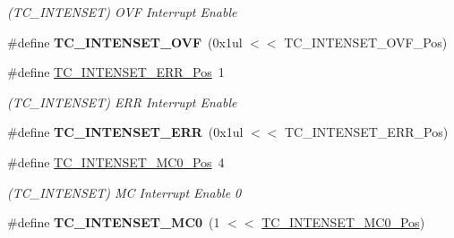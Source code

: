 \begin{DoxyCompactItemize}
\begin{DoxyCompactList}\small\item\em (T\+C\+\_\+\+I\+N\+T\+E\+N\+S\+E\+T) O\+V\+F Interrupt Enable \end{DoxyCompactList}\item 
\hypertarget{group___s_a_m_l21___t_c_ga48976807e0a0c60c70bce24f1c0f7e1d}{}\#define {\bfseries T\+C\+\_\+\+I\+N\+T\+E\+N\+S\+E\+T\+\_\+\+O\+V\+F}~(0x1ul $<$$<$ T\+C\+\_\+\+I\+N\+T\+E\+N\+S\+E\+T\+\_\+\+O\+V\+F\+\_\+\+Pos)\label{group___s_a_m_l21___t_c_ga48976807e0a0c60c70bce24f1c0f7e1d}

\item 
\hypertarget{group___s_a_m_l21___t_c_ga96296c6832f62b741447c9226dee8327}{}\#define \hyperlink{group___s_a_m_l21___t_c_ga96296c6832f62b741447c9226dee8327}{T\+C\+\_\+\+I\+N\+T\+E\+N\+S\+E\+T\+\_\+\+E\+R\+R\+\_\+\+Pos}~1\label{group___s_a_m_l21___t_c_ga96296c6832f62b741447c9226dee8327}

\begin{DoxyCompactList}\small\item\em (T\+C\+\_\+\+I\+N\+T\+E\+N\+S\+E\+T) E\+R\+R Interrupt Enable \end{DoxyCompactList}\item 
\hypertarget{group___s_a_m_l21___t_c_gaa51b27ce018d95a3a16f79acb17a0cb6}{}\#define {\bfseries T\+C\+\_\+\+I\+N\+T\+E\+N\+S\+E\+T\+\_\+\+E\+R\+R}~(0x1ul $<$$<$ T\+C\+\_\+\+I\+N\+T\+E\+N\+S\+E\+T\+\_\+\+E\+R\+R\+\_\+\+Pos)\label{group___s_a_m_l21___t_c_gaa51b27ce018d95a3a16f79acb17a0cb6}

\item 
\hypertarget{group___s_a_m_l21___t_c_gaeb76aeead8335324a610dabc36f7edea}{}\#define \hyperlink{group___s_a_m_l21___t_c_gaeb76aeead8335324a610dabc36f7edea}{T\+C\+\_\+\+I\+N\+T\+E\+N\+S\+E\+T\+\_\+\+M\+C0\+\_\+\+Pos}~4\label{group___s_a_m_l21___t_c_gaeb76aeead8335324a610dabc36f7edea}

\begin{DoxyCompactList}\small\item\em (T\+C\+\_\+\+I\+N\+T\+E\+N\+S\+E\+T) M\+C Interrupt Enable 0 \end{DoxyCompactList}\item 
\hypertarget{group___s_a_m_l21___t_c_gaa097fc56a041e1a17e2e1974a693fe59}{}\#define {\bfseries T\+C\+\_\+\+I\+N\+T\+E\+N\+S\+E\+T\+\_\+\+M\+C0}~(1 $<$$<$ \hyperlink{group___s_a_m_l21___t_c_gaeb76aeead8335324a610dabc36f7edea}{T\+C\+\_\+\+I\+N\+T\+E\+N\+S\+E\+T\+\_\+\+M\+C0\+\_\+\+Pos})\label{group___s_a_m_l21___t_c_gaa097fc56a041e1a17e2e1974a693fe59}


\end{DoxyCompactItemize}
